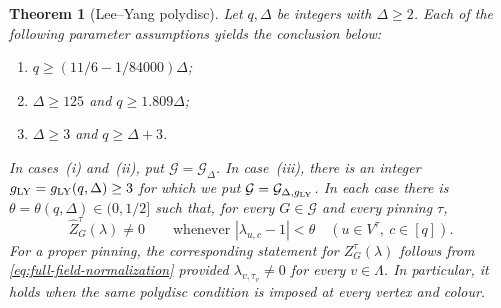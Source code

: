 \documentclass[11pt,reqno]{article}
\theoremstyle{plain}
\newtheorem{theorem}{Theorem}[section]
\theoremstyle{definition}
\theoremstyle{remark}
\theoremstyle{definition}
\theoremstyle{remark}
\newcommand{\Deg}{\Delta}                        %
\newcommand{\colours}{[q]}                        %
\newcommand{\Gdeg}{\mathcal{G}_{\Deg}}
\newcommand{\Gdegg}[1]{\mathcal{G}_{\Deg,#1}}
\newcommand{\Zpin}[2]{Z_{#1}^{#2}}
\newcommand{\nZpin}[2]{\widehat Z_{#1}^{#2}}
\begin{document}
\begin{theorem}[Lee--Yang polydisc]
\label{thm:lee-yang}
Let \(q,\Deg\) be integers with \(\Deg\ge2\).  Each of the following
parameter assumptions yields the conclusion below:
\begin{enumerate}[label=\textup{(\roman*)},leftmargin=2.2em]
  \item \(q\ge(11/6-1/84000)\Deg\);
  \item \(\Deg\ge125\) and \(q\ge1.809\Deg\);
  \item \(\Deg\ge3\) and \(q\ge\Deg+3\).
\end{enumerate}
In cases~\textup{(i)} and~\textup{(ii)}, put \(\mathcal G=\Gdeg\).
In case~\textup{(iii)}, there is an integer
\(g_{\rm LY}=g_{\rm LY}(q,\Deg)\ge3\) for which we put
\(\mathcal G=\Gdegg{g_{\rm LY}}\).  In each case there is
\(\theta=\theta(q,\Deg)\in(0,1/2]\) such that, for every
\(G\in\mathcal G\) and every pinning \(\tau\),
\[
  \nZpin{G}{\tau}(\lambda)\ne0
  \qquad\text{whenever }|\lambda_{u,c}-1|<\theta
  \quad(u\in V^\tau,\ c\in\colours).
\]
For a proper pinning, the corresponding statement for
\(\Zpin{G}{\tau}(\lambda)\) follows from
\eqref{eq:full-field-normalization} provided
\(\lambda_{v,\tau_v}\ne0\) for every \(v\in\Lambda\).  In particular, it
holds when the same polydisc condition is imposed at every vertex and
colour.
\end{theorem}
\end{document}
